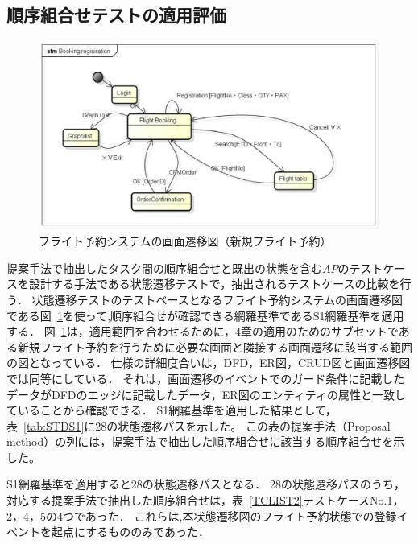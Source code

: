 \subsection{順序組合せテストの適用評価} \label{sec:5-2-2}
\begin{figure}[h]
\begin{center}
\includegraphics[scale=0.5]{./image/screentransition.eps}
\end{center}
\caption{フライト予約システムの画面遷移図（新規フライト予約）}
\label{fig:STD}
\end{figure}

提案手法で抽出したタスク間の順序組合せと既出の状態を含む$AP$のテストケースを設計する手法である状態遷移テストで，抽出されるテストケースの比較を行う．
状態遷移テストのテストベースとなるフライト予約システムの画面遷移図である図~\ref{fig:STD}を使って,順序組合せが確認できる網羅基準であるS1網羅基準を適用する．
図~\ref{fig:STD}は，適用範囲を合わせるために，4章の適用のためのサブセットである新規フライト予約を行うために必要な画面と隣接する画面遷移に該当する範囲の図となっている．
仕様の詳細度合いは，DFD，ER図，CRUD図と画面遷移図では同等にしている．
それは，画面遷移のイベントでのガード条件に記載したデータがDFDのエッジに記載したデータ，ER図のエンティティの属性と一致していることから確認できる．
S1網羅基準を適用した結果として，表~\ref{tab:STDS1}に28の状態遷移パスを示した。
この表の提案手法（Proposal method）の列には，提案手法で抽出した順序組合せに該当する順序組合せを示した。




S1網羅基準を適用すると28の状態遷移パスとなる．
28の状態遷移パスのうち，対応する提案手法で抽出した順序組合せは，表~\ref{TCLIST2}テストケースNo.1，2，4，5の4つであった．
これらは,本状態遷移図のフライト予約状態での登録イベントを起点にするもののみであった．

